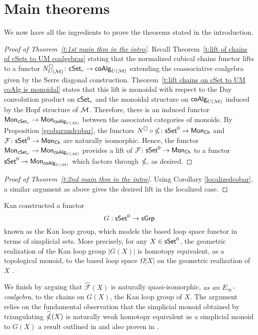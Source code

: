 
\section{Main theorems}

We now have all the ingredients to prove the theorems stated in the introduction. 

\begin{proof}[Proof of Theorem~\ref{t:1st main thm in the intro}]
    Recall Theorem~\ref{t:lift of chains of cSets to UM coalgebras} stating that the normalized cubical chains functor lifts to a functor $N^{\square}_{U(\mathcal{M})} \colon \mathsf{cSet}_c \to \mathsf{coAlg}_{U(\mathcal{M})}$ extending the coassociative coalgebra given by the Serre diagonal construction.
    Theorem~\ref{t:lift chains on cSet to UM coAlg is monoidal} states that this lift is  monoidal with respect to the Day convolution product on $\mathsf{cSet}_c$ and the monoidal structure on $\mathsf{coAlg}_{U(\mathcal{M})}$ induced by the Hopf structure of $\mathcal{M}$.
    Therefore, there is an induced functor $\mathsf{Mon}_{\mathsf{cSet}_c} \to \mathsf{Mon}_{\mathsf{coAlg}_{U(\mathcal{M})}}$ between the associated categories of monoids.
    By Proposition \ref{gcobarandcobar}, the functors $N^{\square} \circ \mathbb{\Omega} \colon \mathsf{sSet}^0 \to \mathsf{Mon}_{\mathsf{Ch}}$ and $\mathcal{F} \colon \mathsf{sSet}^0 \to \mathsf{Mon}_{\mathsf{Ch}}$ are naturally isomorphic.
    Hence, the functor $\mathsf{Mon}_{\mathsf{cSet}_c} \to \mathsf{Mon}_{\mathsf{coAlg}_{U(\mathcal{M})}}$ provides a lift of $\mathcal{F} \colon \mathsf{sSet}^0 \to \mathsf{Mon}_{\mathsf{Ch}}$ to a functor  $\mathsf{sSet}^0 \to \mathsf{Mon}_{\mathsf{coAlg}_{U(\mathcal{M})}}$ which factors through $\mathbb{\Omega},$ as desired.
\end{proof}

\begin{proof}[Proof of Theorem~\ref{t:2nd main thm in the intro}]
Using Corollary \ref{localizedcobar}, a similar argument as above gives the desired lift in the localized case. 
\end{proof}

Kan constructed a functor $$G: \mathsf{sSet}^0 \to \mathsf{sGrp}$$ known as the Kan loop group, which models the based loop space functor in terms of simplicial sets. More precisely, for any $X \in \mathsf{sSet}^0$, the geometric realization of the Kan loop group $|G(X)|$ is homotopy equivalent, as a topological monoid, to the based loop space $\Omega|X|$ on the geometric realization of $X$ \cite{Berger}. 

We finish by arguing that $\widehat{\mathcal{F}}(X)$ is naturally quasi-isomorphic, \textit{as an $E_{\infty}$-coalgebra}, to the chains on $G(X)$, the Kan loop group of $X$. The argument relies on the fundamental observation that the simplicial monoid obtained by triangulating $\widehat{\mathbb{\Omega}}(X)$ is naturally weak homotopy equivalent as a simplicial monoid to $G(X)$ a result outlined in \cite{Hinich} and also proven in \cite{minichello-rivera-zeinalian}. 

